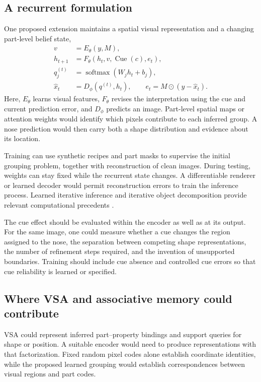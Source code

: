 \documentclass[11pt,letterpaper]{article}
\newcommand{\softmax}{\operatorname{softmax}}
\begin{document}
\subsection{A recurrent formulation}
One proposed extension maintains a spatial visual representation and a changing part-level belief state,
\begin{align}
v&=E_\theta(y,M),\\
h_{t+1}&=F_\theta(h_t,v,\operatorname{Cue}(c),e_t),\\
q_j^{(t)}&=\softmax(W_jh_t+b_j),\\
\widehat x_t&=D_\phi(q^{(t)},h_t),\qquad
e_t=M\odot(y-\widehat x_t).
\end{align}
Here, $E_\theta$ learns visual features, $F_\theta$ revises the interpretation using the cue and current prediction error, and $D_\phi$ predicts an image. Part-level spatial maps or attention weights would identify which pixels contribute to each inferred group. A nose prediction would then carry both a shape distribution and evidence about its location.

Training can use synthetic recipes and part masks to supervise the initial grouping problem, together with reconstruction of clean images. During testing, weights can stay fixed while the recurrent state changes. A differentiable renderer or learned decoder would permit reconstruction errors to train the inference process. Learned iterative inference and iterative object decomposition provide relevant computational precedents \cite{marino2018,greff2019}.

The cue effect should be evaluated within the encoder as well as at its output. For the same image, one could measure whether a cue changes the region assigned to the nose, the separation between competing shape representations, the number of refinement steps required, and the invention of unsupported boundaries. Training should include cue absence and controlled cue errors so that cue reliability is learned or specified.

\subsection{Where VSA and associative memory could contribute}
VSA could represent inferred part--property bindings and support queries for shape or position. A suitable encoder would need to produce representations with that factorization. Fixed random pixel codes alone establish coordinate identities, while the proposed learned grouping would establish correspondences between visual regions and part codes.
\end{document}
